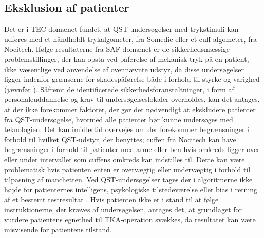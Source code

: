 \subsection{Eksklusion af patienter}
Det er i TEC-domænet fundet, at QST-undersøgelser med trykstimuli kan udføres med et håndholdt trykalgometer, fra Somedic eller et cuff-algometer, fra Nocitech. 
Ifølge resultaterne fra SAF-domænet er de sikkerhedsmæssige problemstillinger, der kan opstå ved påførelse af mekanisk tryk på en patient, ikke væsentlige ved anvendelse af ovennævnte udstyr, da disse undersøgelser ligger indenfor grænserne for skadespåførelse både i forhold til styrke og varighed (jævnfør ). Såfremt de identificerede sikkerhedsforanstaltninger, i form af personaleuddannelse og krav til undersøgelseslokaler overholdes, kan det antages, at der ikke forekommer faktorer, der gør det nødvendigt at ekskludere patienter fra QST-undersøgelse, hvormed alle patienter bør kunne undersøges med teknologien. Det kan imidlertid overvejes om der forekommer begrænsninger i forhold til hvilket QST-udstyr, der benyttes; cuffen fra Nocitech kan have begrænsninger i forhold til patienter med arme eller ben hvis omkreds ligger over eller under intervallet som cuffens omkreds kan indstilles til. Dette kan være problematisk hvis patienten enten er overvægtig eller undervægtig i forhold til tilpasning af manchetten. Ved QST-undersøgelser tages der i algoritmerne ikke højde for patienternes intelligens, psykologiske tilstedeværelse eller bias i retning af et bestemt testresultat \citep{Dyck1998}.  
Hvis patienten ikke er i stand til at følge instruktionerne, der kræves af undersøgelsen, antages det, at grundlaget for vurdere patientens egnethed til TKA-operation svækkes, da resultatet kan være misvisende for patientens tilstand.


